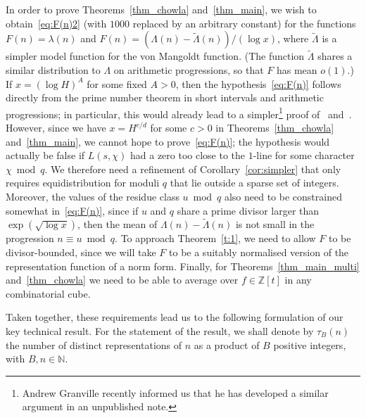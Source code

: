 \documentclass[11pt,letterpaper]{amsart}
\theoremstyle{definition}
\numberwithin{equation}{section}
\newcommand{\0}{\mathbf{0}}
\begin{document}
In order to prove Theorems~\ref{thm_chowla} and~\ref{thm_main}, we wish to obtain~\eqref{eq:F(n)2} (with $1000$ replaced by an arbitrary constant) for the functions $F(n)=\lambda(n)$ and $F(n)=(\Lambda(n)-\widetilde{\Lambda}(n))/(\log x)$, where $\widetilde{\Lambda}$ is a simpler model function for the von Mangoldt function. (The function 
$\widetilde \Lambda$ shares a similar  distribution to $\Lambda$ on arithmetic progressions, so that $F$ has mean $o(1)$.) 
If $x=(\log H)^{A}$ for some fixed $A>0$, then the hypothesis~\eqref{eq:F(n)} 
follows directly from the prime number theorem in short intervals and arithmetic progressions; in particular, this would already lead to a simpler\footnote{Andrew Granville recently informed us that he has developed a similar argument in an unpublished note.} proof of~\cite[Thm.~1.9]{SS} and~\cite[Thm.~2.12]{tera-polynomial}. However,  since we have $x=H^{c/d}$ for some $c>0$ in Theorems~\ref{thm_chowla} and~\ref{thm_main}, we cannot hope to prove~\eqref{eq:F(n)}; the hypothesis would actually be false if $L(s,\chi)$ had a zero too close to the $1$-line for some character $\chi\bmod q$. We therefore need a refinement of Corollary~\ref{cor:simpler} that only requires equidistribution   for  moduli  $q$ that lie outside a sparse set of integers. Moreover, the values of the residue class $u\bmod q$ also need to be constrained somewhat in~\eqref{eq:F(n)}, since if $u$ and $q$ share a  prime divisor larger than $\exp(\sqrt{\log x})$, then the mean of $\Lambda(n)-\widetilde{\Lambda}(n)$ is not small in the progression $n\equiv u\bmod q$. To approach Theorem~\ref{t:1}, we need to allow $F$ to be divisor-bounded, since we will take $F$ to be a suitably normalised version of the representation function of a norm form. Finally, for Theorems~\ref{thm_main_multi} and~\ref{thm_chowla} we need to be able to average over $f\in \mathbb{Z}[t]$ in any combinatorial cube. 

Taken together,
these requirements lead us to the following formulation of our key technical result.
For the statement of the result, we shall denote by $\tau_B(n)$ the number of distinct representations of $n$ as a product of $B$ positive integers, with $B,n \in \mathbb{N}$.
\end{document}
